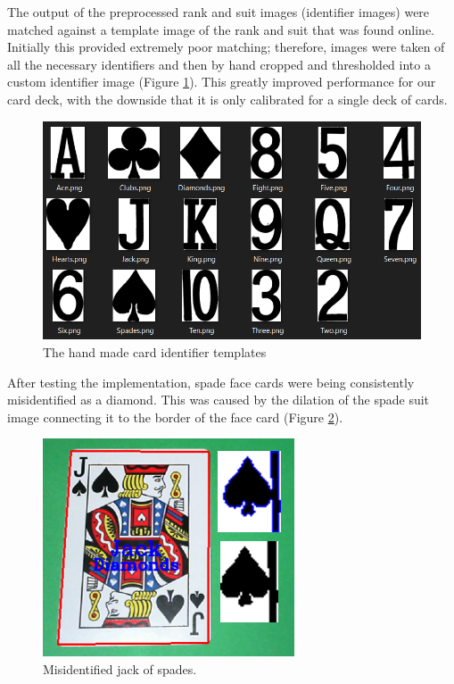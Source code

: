 \documentclass[conference]{IEEEtran}
\begin{document}
The output of the preprocessed rank and suit images (identifier images) were matched against a
template image of the rank and suit that was found online. Initially this provided extremely poor
matching; therefore, images were taken of all the necessary identifiers and then by hand cropped and
thresholded into a custom identifier image (Figure \ref{fig:templates}). This greatly improved
performance for our card deck, with the downside that it is only calibrated for a single deck of
cards.

\begin{figure}[htbp]
\centerline{\includegraphics[width=\columnwidth]{templates.png}}
\caption{The hand made card identifier templates}
\label{fig:templates}
\end{figure}

After testing the implementation, spade face cards were being consistently misidentified as a
diamond. This was caused by the dilation of the spade suit image connecting it to the border of the
face card (Figure \ref{fig:bad-jack}).

\begin{figure}[htbp]
\centerline{\includegraphics[width=\columnwidth]{bad-jack.png}}
\caption{Misidentified jack of spades.}
\label{fig:bad-jack}
\end{figure}
\end{document}
